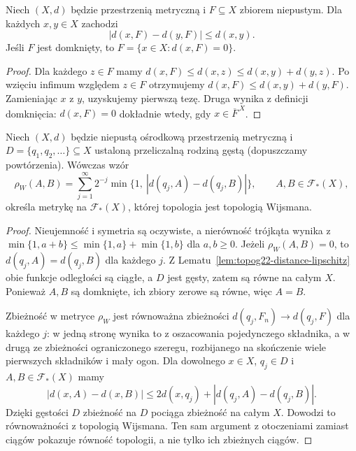 \begin{lemat}
\label{lem:topog22-distance-lipschitz}
Niech \((X,d)\) będzie przestrzenią metryczną
i \(F\subseteq X\) zbiorem niepustym.
Dla każdych \(x,y\in X\) zachodzi
\[
 |d(x,F)-d(y,F)|\le d(x,y).
\]
Jeśli \(F\) jest domknięty, to
\(F=\{x\in X:d(x,F)=0\}\).
\end{lemat}
\begin{proof}
Dla każdego \(z\in F\) mamy
\(d(x,F)\le d(x,z)\le d(x,y)+d(y,z)\).
Po wzięciu infimum względem \(z\in F\)
otrzymujemy \(d(x,F)\le d(x,y)+d(y,F)\).
Zamieniając \(x\) z \(y\), uzyskujemy pierwszą tezę.
Druga wynika z definicji domknięcia:
\(d(x,F)=0\) dokładnie wtedy, gdy
\(x\in\overline F^{\,X}\).
\end{proof}

\begin{twierdzenie}
\label{thm:topog22-wijsman-metrizable}
Niech \((X,d)\) będzie niepustą ośrodkową
przestrzenią metryczną i
\(D=\{q_1,q_2,\ldots\}\subseteq X\)
ustaloną przeliczalną rodziną gęstą
(dopuszczamy powtórzenia).
Wówczas wzór
\[
 \rho_W(A,B)=\sum_{j=1}^{\infty}2^{-j}
       \min\{1,\ |d(q_j,A)-d(q_j,B)|\},
 \qquad A,B\in\mathcal F_*(X),
\]
określa metrykę na \(\mathcal F_*(X)\),
której topologia jest topologią Wijsmana.
\end{twierdzenie}
\begin{proof}
Nieujemność i symetria są oczywiste,
a nierówność trójkąta wynika z
\(\min\{1,a+b\}\le\min\{1,a\}+\min\{1,b\}\)
dla \(a,b\ge0\).
Jeżeli \(\rho_W(A,B)=0\), to
\(d(q_j,A)=d(q_j,B)\) dla każdego \(j\).
Z Lematu~\ref{lem:topog22-distance-lipschitz}
obie funkcje odległości są ciągłe,
a \(D\) jest gęsty, zatem są równe na całym \(X\).
Ponieważ \(A,B\) są domknięte, ich zbiory zerowe
są równe, więc \(A=B\).

Zbieżność w metryce \(\rho_W\) jest równoważna
zbieżności \(d(q_j,F_n)\to d(q_j,F)\) dla każdego \(j\):
w jedną stronę wynika to z oszacowania
pojedynczego składnika, a w drugą ze zbieżności
ograniczonego szeregu, rozbijanego na
skończenie wiele pierwszych składników i mały ogon.
Dla dowolnego \(x\in X\), \(q_j\in D\)
i \(A,B\in\mathcal F_*(X)\) mamy
\[
 |d(x,A)-d(x,B)|
 \le 2d(x,q_j)+|d(q_j,A)-d(q_j,B)|.
\]
Dzięki gęstości \(D\) zbieżność na \(D\)
pociąga zbieżność na całym \(X\).
Dowodzi to równoważności z topologią Wijsmana.
Ten sam argument z otoczeniami zamiast ciągów
pokazuje równość topologii, a nie tylko
ich zbieżnych ciągów.
\end{proof}


